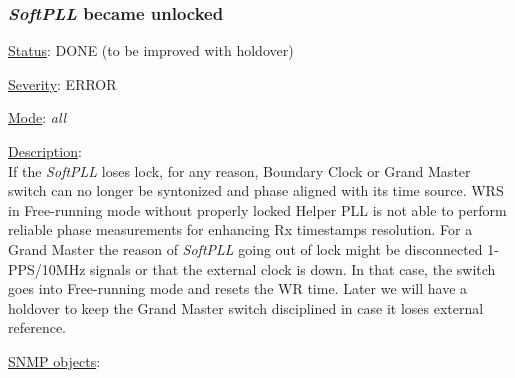 \subsubsection{\bf \emph{SoftPLL} became unlocked}
		\label{fail:timing:spll_unlock}
		\begin{pck_descr}
			\item [] \underline{Status}: DONE (to be improved with holdover)
			\item [] \underline{Severity}: ERROR
			\item [] \underline{Mode}: \emph{all}
			\item [] \underline{Description}:\\
				If the \emph{SoftPLL} loses lock, for any reason, Boundary Clock or
				Grand Master switch can no longer be syntonized and phase aligned with
				its time source. WRS in Free-running mode without properly locked Helper
				PLL is not able to perform reliable phase measurements for enhancing Rx
				timestamps resolution. For a Grand Master the reason of \emph{SoftPLL}
				going out of lock might be disconnected 1-PPS/10MHz signals or that the
				external clock is down. In that case, the switch goes into Free-running
				mode and resets the WR time. Later we will have a holdover to keep the
				Grand Master switch disciplined in case it loses external reference.
			\item [] \underline{SNMP objects}:\\
				{\footnotesize
				\\
				\\
				\\
				\\
				\\
				\\
				\\
				 \\
				 }
		\end{pck_descr}

